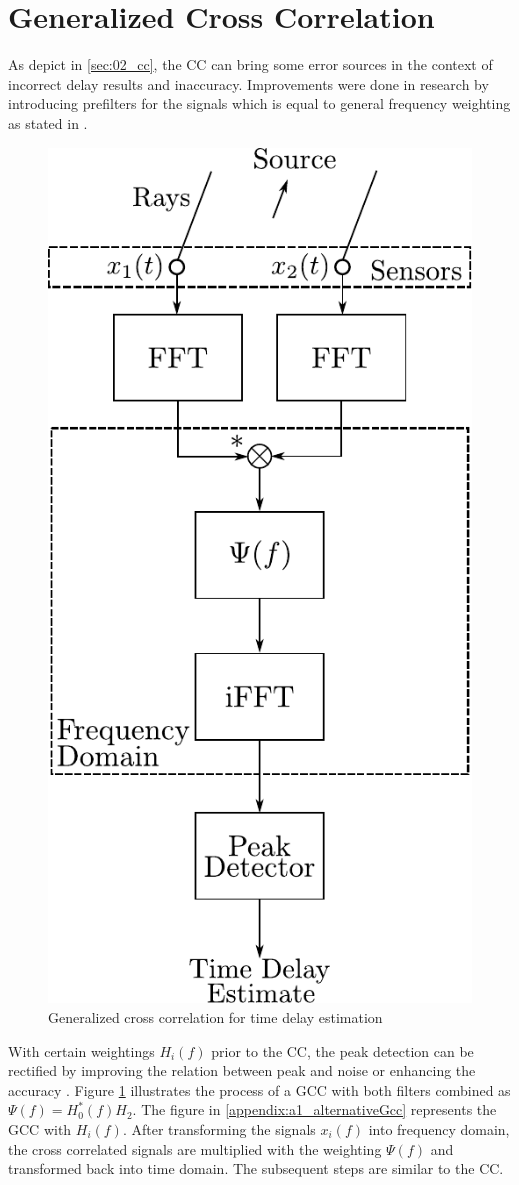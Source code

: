 \section{Generalized Cross Correlation}
\label{sec:02_gcc}

As depict in \cref{sec:02_cc}, the \ac{CC} can bring some error sources in the context of
incorrect delay results and inaccuracy.
Improvements were done in research by introducing prefilters for the signals
which is equal to general frequency weighting as stated in \cite{K_C_GCC}.
\begin{figure}[ht]
	\centering
		\includegraphics[width=0.35\columnwidth]{figures/GCC_weight}
	\caption{Generalized cross correlation for time delay estimation}
    \label{fig:02_GCC}
\end{figure}
With certain weightings $H_i(f)$ prior to the \ac{CC}, the peak detection
can be rectified by improving the relation between peak and noise or
enhancing the accuracy \cite{H_B_GCC}.
Figure \cref{fig:02_GCC} illustrates the process of a \ac{GCC} with both filters combined as
$\Psi(f) = H_0^*(f)H_2$. The figure in \cref{appendix:a1_alternativeGcc} represents the
\ac{GCC} with $H_i(f)$.
After transforming the signals $x_i(f)$ into frequency domain, the cross correlated
signals are multiplied with the weighting $\Psi(f)$ and transformed back into time domain.
The subsequent steps are similar to the \ac{CC}.

